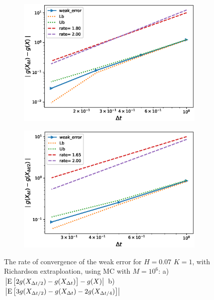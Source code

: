 \documentclass[11pt]{article}
\newcommand{\expt}[1]{\mathrm{E}\left[#1\right]}
\begin{document}
 \begin{figure}[h!]
 	\centering
 	\begin{subfigure}{.4\textwidth}
 		\centering
 		\includegraphics[width=1\linewidth]{./figures/rBergomi_weak_error_rates/with_change_measure/with_rich/weak_convergence_order_Bergomi_H_007_K_1_M_10_5_CI_relative_measure_change_level_1_spec}
 		\caption{}
 		\label{fig:sub3}
 	\end{subfigure}%
 	\begin{subfigure}{.4\textwidth}
 		\centering
 		\includegraphics[width=1\linewidth]{./figures/rBergomi_weak_error_rates/with_change_measure/with_rich/weak_convergence_order_differences_Bergomi_H_007_K_1_M_10_5_CI_relative_measure_change_level_1_spec}
 		\caption{}
 		\label{fig:sub4}
 	\end{subfigure}
 	
 	\caption{The rate of convergence of the weak error for $H=0.07$ $K=1$, with Richardson extraploation, using MC with $M=10^6$: a) $\abs{\expt{2 g(X_{\Delta t/2}) -g(X_{\Delta t})}-g(X)}$  b) $\abs{\expt{3 g(X_{\Delta t/2})-g(X_{\Delta t})-2 g(X_{\Delta t/4})}}$ }
 	\label{fig:Weak_rate_H_007_with_rich_change_measure}
 \end{figure}
 
\end{document}

